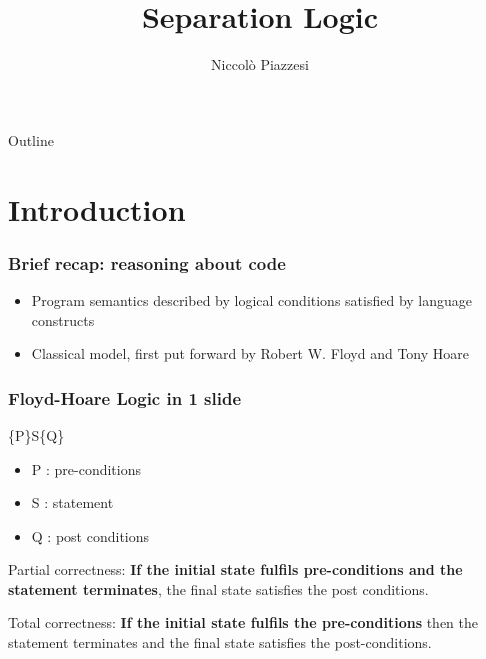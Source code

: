 \documentclass{beamer}
\title{Separation Logic}
\author{Niccolò Piazzesi}
\institute{
    Università degli studi di Pisa
}
\begin{document}
  \frame{\titlepage}
    \begin{frame}{Outline}
        \tableofcontents[hideallsubsections]
    \end{frame}
    \section{Introduction}
    \begin{frame}
            \frametitle{Brief recap: reasoning about code}
            
            \begin{itemize}
                \item Program semantics described by logical conditions satisfied by language constructs
                \item Classical model, first put forward by Robert W. Floyd and Tony Hoare
            \end{itemize}
            
        
    \end{frame}
    \begin{frame}
        \frametitle{Floyd-Hoare Logic in 1 slide}
        \begin{center}
            \huge
            \{P\}S\{Q\}
        \end{center}
        \begin{itemize}
            \item P : pre-conditions
            \item S : statement
            \item Q : post conditions
        \end{itemize}
        \bigskip
        
        Partial correctness: \textbf{If the initial state fulfils pre-conditions and the statement terminates}, the final state satisfies the post conditions.
        \medskip

        Total correctness: \textbf{If the initial state fulfils the pre-conditions} then the statement terminates and the final state satisfies the post-conditions.
    \end{frame}
\end{document}
